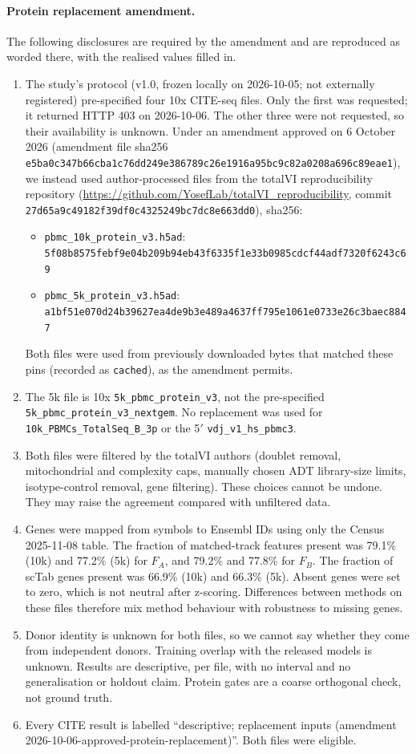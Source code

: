 \documentclass[11pt]{article}
\begin{document}
\paragraph{Protein replacement amendment.} The following disclosures are required by the amendment and are reproduced as worded there, with the realised values filled in.

\begin{enumerate}
\item The study's protocol (v1.0, frozen locally on 2026-10-05; not externally registered) pre-specified four 10x CITE-seq files. Only the first was requested; it returned HTTP 403 on 2026-10-06. The other three were not requested, so their availability is unknown. Under an amendment approved on 6 October 2026 (amendment file sha256 \nolinkurl{e5ba0c347b66cba1c76dd249e386789c26e1916a95bc9c82a0208a696c89eae1}), we instead used author-processed files from the totalVI reproducibility repository (\url{https://github.com/YosefLab/totalVI_reproducibility}, commit \nolinkurl{27d65a9c49182f39df0c4325249bc7dc8e663dd0}), sha256:
\begin{itemize}
\item \nolinkurl{pbmc_10k_protein_v3.h5ad}: \nolinkurl{5f08b8575febf9e04b209b94eb43f6335f1e33b0985cdcf44adf7320f6243c69}
\item \nolinkurl{pbmc_5k_protein_v3.h5ad}: \nolinkurl{a1bf51e070d24b39627ea4de9b3e489a4637ff795e1061e0733e26c3baec8847}
\end{itemize}
Both files were used from previously downloaded bytes that matched these pins (recorded as \texttt{cached}), as the amendment permits.
\item The 5k file is 10x \nolinkurl{5k_pbmc_protein_v3}, not the pre-specified \nolinkurl{5k_pbmc_protein_v3_nextgem}. No replacement was used for \nolinkurl{10k_PBMCs_TotalSeq_B_3p} or the 5$'$ \nolinkurl{vdj_v1_hs_pbmc3}.
\item Both files were filtered by the totalVI authors (doublet removal, mitochondrial and complexity caps, manually chosen ADT library-size limits, isotype-control removal, gene filtering). These choices cannot be undone. They may raise the agreement compared with unfiltered data.
\item Genes were mapped from symbols to Ensembl IDs using only the Census 2025-11-08 table. The fraction of matched-track features present was 79.1\% (10k) and 77.2\% (5k) for $F_A$, and 79.2\% and 77.8\% for $F_B$. The fraction of scTab genes present was 66.9\% (10k) and 66.3\% (5k). Absent genes were set to zero, which is not neutral after z-scoring. Differences between methods on these files therefore mix method behaviour with robustness to missing genes.
\item Donor identity is unknown for both files, so we cannot say whether they come from independent donors. Training overlap with the released models is unknown. Results are descriptive, per file, with no interval and no generalisation or holdout claim. Protein gates are a coarse orthogonal check, not ground truth.
\item Every CITE result is labelled ``descriptive; replacement inputs (amendment 2026-10-06-approved-protein-replacement)''. Both files were eligible.
\end{enumerate}
\end{document}
